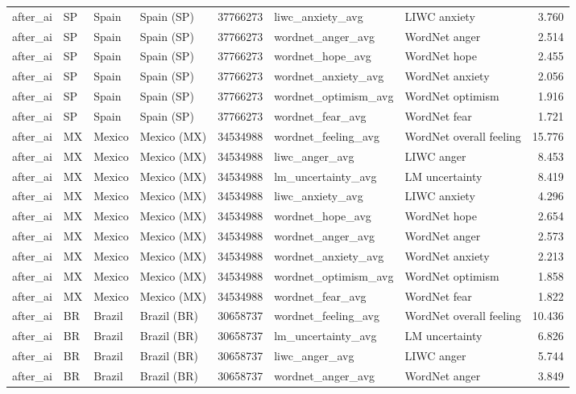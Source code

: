 \begin{tabular}{llllrllr}
after\_ai & SP & Spain & Spain (SP) & 37766273 & liwc\_anxiety\_avg & LIWC anxiety & 3.760 \\
after\_ai & SP & Spain & Spain (SP) & 37766273 & wordnet\_anger\_avg & WordNet anger & 2.514 \\
after\_ai & SP & Spain & Spain (SP) & 37766273 & wordnet\_hope\_avg & WordNet hope & 2.455 \\
after\_ai & SP & Spain & Spain (SP) & 37766273 & wordnet\_anxiety\_avg & WordNet anxiety & 2.056 \\
after\_ai & SP & Spain & Spain (SP) & 37766273 & wordnet\_optimism\_avg & WordNet optimism & 1.916 \\
after\_ai & SP & Spain & Spain (SP) & 37766273 & wordnet\_fear\_avg & WordNet fear & 1.721 \\
after\_ai & MX & Mexico & Mexico (MX) & 34534988 & wordnet\_feeling\_avg & WordNet overall feeling & 15.776 \\
after\_ai & MX & Mexico & Mexico (MX) & 34534988 & liwc\_anger\_avg & LIWC anger & 8.453 \\
after\_ai & MX & Mexico & Mexico (MX) & 34534988 & lm\_uncertainty\_avg & LM uncertainty & 8.419 \\
after\_ai & MX & Mexico & Mexico (MX) & 34534988 & liwc\_anxiety\_avg & LIWC anxiety & 4.296 \\
after\_ai & MX & Mexico & Mexico (MX) & 34534988 & wordnet\_hope\_avg & WordNet hope & 2.654 \\
after\_ai & MX & Mexico & Mexico (MX) & 34534988 & wordnet\_anger\_avg & WordNet anger & 2.573 \\
after\_ai & MX & Mexico & Mexico (MX) & 34534988 & wordnet\_anxiety\_avg & WordNet anxiety & 2.213 \\
after\_ai & MX & Mexico & Mexico (MX) & 34534988 & wordnet\_optimism\_avg & WordNet optimism & 1.858 \\
after\_ai & MX & Mexico & Mexico (MX) & 34534988 & wordnet\_fear\_avg & WordNet fear & 1.822 \\
after\_ai & BR & Brazil & Brazil (BR) & 30658737 & wordnet\_feeling\_avg & WordNet overall feeling & 10.436 \\
after\_ai & BR & Brazil & Brazil (BR) & 30658737 & lm\_uncertainty\_avg & LM uncertainty & 6.826 \\
after\_ai & BR & Brazil & Brazil (BR) & 30658737 & liwc\_anger\_avg & LIWC anger & 5.744 \\
after\_ai & BR & Brazil & Brazil (BR) & 30658737 & wordnet\_anger\_avg & WordNet anger & 3.849 \\

\end{tabular}
